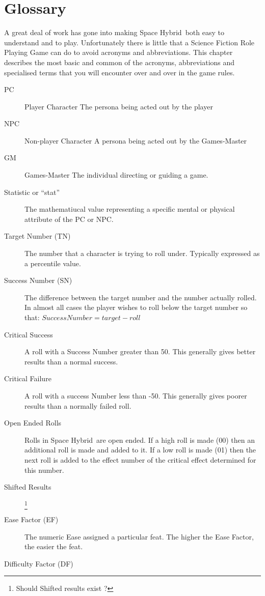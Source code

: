 \chapter{Glossary}
A great deal of work has gone into making Space Hybrid\ both
easy to understand and to play. Unfortunately there is little
that a Science Fiction Role Playing Game can do to avoid
acronyms and abbreviations. This chapter describes the most basic 
and common of the acronyms, abbreviations and specialised 
terms that you will encounter over and over in the game rules. 

\begin{description}
	\item[PC] Player Character 
    The persona being acted out by the player
    \item[NPC] Non-player Character
    A persona being acted out by the Games-Master
    \item[GM] Games-Master
    The individual directing or guiding a game.
    \item[Statistic or ``stat'']
    The mathematiucal value representing a specific mental or 
	physical attribute of the PC or NPC.
	\item[Target Number (TN)] 
	The number that a character is trying to roll under. 
	Typically expressed as a percentile value.
	\item[Success Number (SN)] 
	The difference between the target number and the number actually rolled. In
	almost all cases the player wishes to roll below the target number so that:
	\(Success Number = target - roll\)
    \item[Critical Success]
	A roll with a Success Number greater than 50. This generally gives better results than 
	a normal success.
    \item[Critical Failure]
    A roll with a success Number less than -50. This generally gives poorer 
    results than a normally failed roll.
	\item[Open Ended Rolls]
	Rolls in Space Hybrid\ are open ended. If a high roll is made (00)
	then an additional roll is made and added to it. If a low roll is 
	made (01) then the next roll is added to the effect number of the 
	critical effect determined for this number. 
    \item[Shifted Results]\footnote{Should Shifted results exist ?}
	\item[Ease Factor (EF)] 
	The numeric Ease assigned a particular feat. The higher the Ease Factor, the
	easier the feat.
	\item[Difficulty Factor (DF)] 

\end{description}
